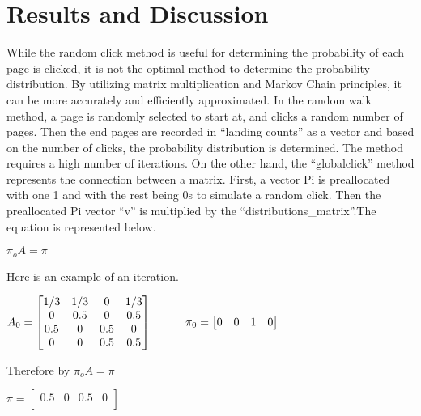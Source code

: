 \documentclass{article}
\begin{document}
 
\section{Results and Discussion}
\quad \quad \quad 
While the random click method is useful for determining the probability of each page is clicked, it is not the optimal method to determine the probability distribution. By utilizing matrix multiplication and Markov Chain principles, it can be more accurately and efficiently approximated. In the random walk method, a page is randomly selected to start at, and clicks a random number of pages. Then the end pages are recorded in “landing counts” as a vector and based on the number of clicks, the probability distribution is determined. The method requires a high number of iterations. On the other hand, the “globalclick” method represents the connection between a matrix. First, a vector Pi is preallocated with one 1 and with the rest being 0s to simulate a random click. Then the preallocated Pi vector “v” is multiplied by the “distributions\_matrix”.The equation is represented below. 

\bigskip

\begin{center}
\label{Eqn. 1}
   $\pi_{o}A = \pi$
   
\end{center}

Here is an example of an iteration. \bigskip
\begin{center}
    $A_0 = 
   \begin{bmatrix}
     1/3 & 1/3 & 0 & 1/3\\
     0 & 0.5 & 0 & 0.5\\
     0.5 & 0 & 0.5 & 0\\
     0 & 0 & 0.5 & 0.5\\
    \end{bmatrix}      
    \bigskip \bigskip \quad\quad\quad
    \pi_0 = 
   \begin{bmatrix}
     0 & 0 & 1 & 0\\
    \end{bmatrix}$
\end{center}

\begin{center}
    Therefore by\quad
   $\pi_{o}A = \pi$
\end{center}

\begin{center}

   $\pi = 
      \begin{bmatrix}
     0.5 & 0 & 0.5 & 0\\
    \end{bmatrix} 
   $
\end{center}
\bigskip
\end{document}
